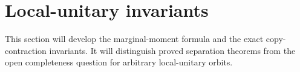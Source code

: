 \section{Local-unitary invariants}

This section will develop the marginal-moment formula and the exact
copy-contraction invariants.  It will distinguish proved separation
theorems from the open completeness question for arbitrary local-unitary
orbits.

